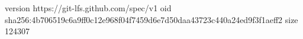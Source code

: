 version https://git-lfs.github.com/spec/v1
oid sha256:4b706519c6a9ff0c12e968f04f7459d6e7d50daa43723c440a24ed9f3f1aeff2
size 124307

